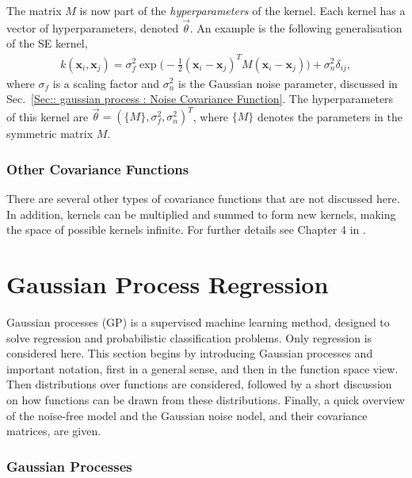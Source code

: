 \documentclass[twoside,english]{uiofysmaster}
\begin{document}
{The matrix $M$ is now part of the \textit{hyperparameters} of the kernel. Each kernel has a vector of hyperparameters, denoted $\vec{\theta}$. An example is the following generalisation of the SE kernel, 
\begin{align}
k(\textbf{x}_i, \textbf{x}_j) = \sigma_f^2 \exp \big(- \frac{1}{2} (\textbf{x}_i - \textbf{x}_j)^T M (\textbf{x}_i - \textbf{x}_j) \big) + \sigma_n^2 \delta_{ij},
\end{align}
where $\sigma_f$ is a scaling factor and $\sigma_n^2$ is the Gaussian noise parameter, discussed in Sec.~\ref{Sec:: gaussian process : Noise Covariance Function}. The hyperparameters of this kernel are $\vec{\theta} = (\{M\}, \sigma^2_f, \sigma_n^2)^T$, where $\{M\}$ denotes the parameters in the symmetric matrix $M$. 

\subsubsection{Other Covariance Functions}

There are several other types of covariance functions that are not discussed here. In addition, kernels can be multiplied and summed to form new kernels, making the space of possible kernels infinite. For further details see Chapter 4 in \cite{rasmussen2006gaussian}.




\section{Gaussian Process Regression}\label{Sec: gaussian process : Gaussian Process Regression}

Gaussian processes (GP) is a supervised machine learning method, designed to solve regression and probabilistic classification problems. Only regression is considered here. This section begins by introducing Gaussian processes and important notation, first in a general sense, and then in the function space view. Then distributions over functions are considered, followed by a short discussion on how functions can be drawn from these distributions. Finally, a quick overview of the noise-free model and the Gaussian noise nodel, and their covariance matrices, are given.

\subsubsection{Gaussian Processes}\label{Sec:: gaussian process : Gaussian Processes}

}
\end{document}
